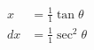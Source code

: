 \documentclass[preview]{standalone}
\begin{document}
\begin{align*}
x&=\frac{1}{1}\tan\theta \\ dx&= \frac{1}{1}\sec^2\theta
\end{align*}
\end{document}
